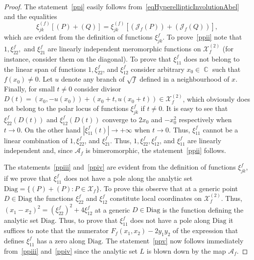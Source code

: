 \documentclass{amsart}
\numberwithin{equation}{section}
\theoremstyle{definition}
\theoremstyle{remark}
\DeclareMathOperator{\CC}{\mathbb C}
\begin{document}
	\begin{proof}
		The statement~\ref{ppi} easily follows from~\eqref{eqHyperellipticInvolutionAbel} and the equalities
		\[
		\xi_{jk}^{(f)}\left[(P) + (Q)\right] = \xi_{jk}^{(f)}\left[(\mathscr J_f(P)) + (\mathscr J_f(Q))\right],
		\]
		which are evident from the definition of functions $\xi_{jk}^f$. To prove~\ref{ppii} note that $1, \xi^f_{22},$ and $\xi^f_{21}$ are linearly independent meromorphic functions on $\mathcal X_f^{(2)}$ (for instance, consider them on the diagonal). To prove that $\xi^f_{11}$ does not belong to the linear span of functions $1, \xi^f_{22}$, and $\xi_{12}^f$ consider arbitrary $x_0 \in \CC$ such that $f(x_0) \ne 0$. Let $u$ denote any branch of $\sqrt{f}$ defined in a neighbourhood of $x$. Finally, for small $t \ne 0$ consider divisor $D(t) = (x_0, -u(x_0)) + (x_0 + t, u(x_0 + t)) \in \mathcal X_f^{(2)}$, which obviously does not belong to the polar locus of functions $\xi_{jk}^f$ if $t \ne 0$. It is easy to see that $\xi_{22}^f(D(t))$ and $\xi_{12}^f(D(t))$ converge to $2x_0$ and $-x_0^2$ respectively when $t \to 0$. On the other hand $|\xi_{11}^f(t)| \to +\infty$ when $t \to 0$. Thus, $\xi_{11}^f$ cannot be a linear combination of $1, \xi_{22}^f$, and $\xi_{21}^f$. Thus, $1, \xi_{22}^f, \xi_{12}^f$, and $\xi_{11}^f$ are linearly independent and, since $\mathscr A_f$ is bimeromorphic, the statement~\ref{ppii} follows.
		
		The statements~\ref{ppiii} and~\ref{ppiv} are evident from the definition of functions $\xi_{jk}^f$, if we prove that $\xi_{11}^f$ does not have a pole along the analytic set $\mathrm{Diag} = \{(P) + (P): P \in \mathcal X_f\}$. To prove this observe that at a generic point $D \in \mathrm{Diag}$ the functions $\xi_{22}^f$ and $\xi_{12}^f$ constitute local coordinates on $\mathcal X_f^{(2)}$. Thus, $(x_1 - x_2)^2 = \left(\xi_{22}^f\right)^2 + 4\xi_{12}^f$ at a generic $D \in \mathrm{Diag}$ is the function defining the analytic set $\mathrm{Diag}$. Thus, to prove that $\xi_{11}^f$ does not have a pole along $\mathrm{Diag}$ it suffices to note that the numerator $F_f(x_1,x_2) - 2y_1y_2$ of the expression that defines $\xi_{11}^f$ has a zero along $\mathrm{Diag}$. The statement~\ref{ppv} now follows immediately from~\ref{ppiii} and~\ref{ppiv} since the analytic set $L$ is blown down by the map $\mathscr A_f$.
		
	\end{proof}
	
\end{document}
